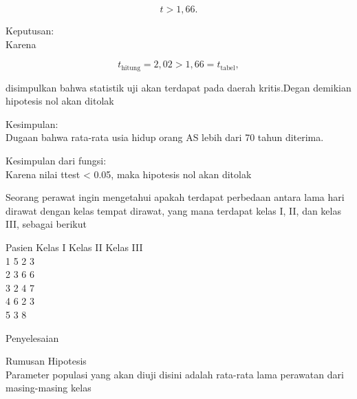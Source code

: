 \documentclass[a4paper,10pt]{article}
\begin{document}
\begin{eulernotebook}
\begin{eulercomment}
\begin{eulercomment}
\begin{eulercomment}
\begin{eulercomment}
\begin{eulercomment}
\begin{eulercomment}
\begin{eulercomment}
\end{eulercomment}
\begin{eulerformula}
\[
t > 1,\!66.
\]
\end{eulerformula}
\begin{eulercomment}
Keputusan:\\
Karena\\
\end{eulercomment}
\begin{eulerformula}
\[
t_{\text{hitung}} = 2,\!02 > 1,\!66 = t_{\text{tabel}},
\]
\end{eulerformula}
\begin{eulercomment}
disimpulkan bahwa statistik uji akan terdapat pada daerah kritis.Degan
demikian hipotesis nol akan ditolak

Kesimpulan:\\
Dugaan bahwa rata-rata usia hidup orang AS lebih dari 70 tahun
diterima.

Kesimpulan dari fungsi:\\
Karena nilai ttest \textless{} 0.05, maka hipotesis nol akan ditolak
\end{eulercomment}
\begin{eulercomment}
Seorang perawat ingin mengetahui apakah terdapat perbedaan antara lama
hari dirawat dengan kelas tempat dirawat, yang mana terdapat kelas I,
II, dan kelas III, sebagai berikut

Pasien \textbar{} Kelas I \textbar{} Kelas II \textbar{} Kelas III\\
1      \textbar{} 5       \textbar{} 2        \textbar{} 3\\
2      \textbar{} 3       \textbar{} 6        \textbar{} 6\\
3      \textbar{} 2       \textbar{} 4        \textbar{} 7\\
4      \textbar{} 6       \textbar{} 2        \textbar{} 3\\
5      \textbar{} 3       \textbar{}          \textbar{} 8

Penyelesaian

Rumusan Hipotesis\\
Parameter populasi yang akan diuji  disini adalah rata-rata lama
perawatan dari masing-masing kelas


\end{eulercomment}
\end{eulercomment}
\end{eulercomment}
\end{eulercomment}
\end{eulercomment}
\end{eulercomment}
\end{eulercomment}
\end{eulernotebook}
\end{document}
